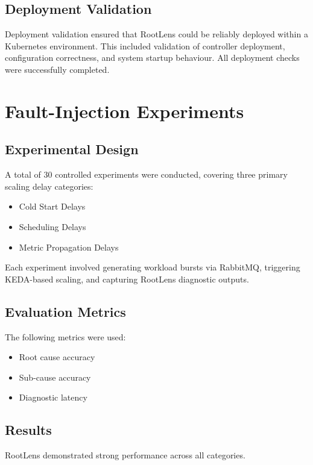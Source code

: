 \subsection{Deployment Validation}
Deployment validation ensured that RootLens could be reliably deployed within a Kubernetes environment. This included validation of controller deployment, configuration correctness, and system startup behaviour. All deployment checks were successfully completed.

\section{Fault-Injection Experiments}

\subsection{Experimental Design}
A total of 30 controlled experiments were conducted, covering three primary scaling delay categories:

\begin{itemize}
    \item Cold Start Delays
    \item Scheduling Delays
    \item Metric Propagation Delays
\end{itemize}

Each experiment involved generating workload bursts via RabbitMQ, triggering KEDA-based scaling, and capturing RootLens diagnostic outputs.

\subsection{Evaluation Metrics}
The following metrics were used:

\begin{itemize}
    \item Root cause accuracy
    \item Sub-cause accuracy
    \item Diagnostic latency
\end{itemize}

\subsection{Results}
RootLens demonstrated strong performance across all categories.

